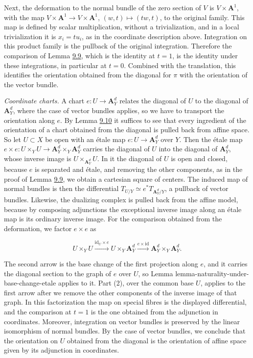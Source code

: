 \documentclass[11pt]{article}
\begin{document}
Next, the deformation to the normal bundle of the zero section of \(V\) is \(V\times\mathbf A^1\), with the map \(V\times\mathbf A^1\to V\times\mathbf A^1\), \((w,t)\mapsto(tw,t)\), to the original family. This map is defined by scalar multiplication, without a trivialization, and in a local trivialization it is \(x_i=tu_i\), as in the coordinate description above. Integration on this product family is the pullback of the original integration. Therefore the comparison of Lemma \hyperref[bp27]{9.9}, which is the identity at \(t=1\), is the identity under these integrations, in particular at \(t=0\). Combined with the translation, this identifies the orientation obtained from the diagonal for \(\pi\) with the orientation of the vector bundle.

\emph{Coordinate charts.} A chart \(e:U\to\mathbf A^d_Y\) relates the diagonal of \(U\) to the diagonal of \(\mathbf A^d_Y\), where the case of vector bundles applies, so we have to transport the orientation along \(e\). By Lemma \hyperref[bp30]{9.10} it suffices to see that every ingredient of the orientation of a chart obtained from the diagonal is pulled back from affine space. So let \(U\subset X\) be open with an étale map \(e:U\to\mathbf A^d_Y\) over \(Y\). Then the étale map \(e\times e:U\times_YU\to\mathbf A^d_Y\times_Y\mathbf A^d_Y\) carries the diagonal of \(U\) into the diagonal of \(\mathbf A^d_Y\), whose inverse image is \(U\times_{\mathbf A^d_Y}U\). In it the diagonal of \(U\) is open and closed, because \(e\) is separated and étale, and removing the other components, as in the proof of Lemma \hyperref[bp27]{9.9}, we obtain a cartesian square of centers. The induced map of normal bundles is then the differential \(T_{U/Y}\simeq e^*T_{\mathbf A^d_Y/Y}\), a pullback of vector bundles. Likewise, the dualizing complex is pulled back from the affine model, because by composing adjunctions the exceptional inverse image along an étale map is its ordinary inverse image. For the comparison obtained from the deformation, we factor \(e\times e\) as

\[
U\times_YU\xrightarrow{\mathrm{id}_U\times e}
U\times_Y\mathbf A^d_Y\xrightarrow{e\times\mathrm{id}}
\mathbf A^d_Y\times_Y\mathbf A^d_Y.
\]

The second arrow is the base change of the first projection along \(e\), and it carries the diagonal section to the graph of \(e\) over \(U\), so Lemma lemma-naturality-under-base-change-etale applies to it. Part (2), over the common base \(U\), applies to the first arrow after we remove the other components of the inverse image of that graph. In this factorization the map on special fibres is the displayed differential, and the comparison at \(t=1\) is the one obtained from the adjunction in coordinates. Moreover, integration on vector bundles is preserved by the linear isomorphism of normal bundles. By the case of vector bundles, we conclude that the orientation on \(U\) obtained from the diagonal is the orientation of affine space given by its adjunction in coordinates.
\end{document}
